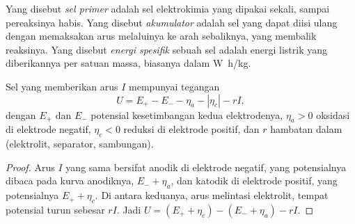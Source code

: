 \begin{definition}[Baterai]\label{def:b2:batteries-electrolysis:battery}
Yang disebut \emph{sel primer} adalah sel elektrokimia
yang dipakai sekali, sampai pereaksinya habis. Yang disebut
\emph{akumulator} adalah sel yang dapat diisi ulang
dengan memaksakan arus melaluinya ke arah sebaliknya, yang membalik
reaksinya. Yang disebut \emph{energi spesifik}
sebuah sel adalah energi listrik yang diberikannya per satuan massa,
biasanya dalam \unit{W.h/kg}.
\end{definition}

\begin{proposition}\label{prop:b2:batteries-electrolysis:delivering}
Sel yang memberikan arus $I$ mempunyai tegangan
\[
  U = E_+ - E_- - \eta_a - |\eta_c| - rI ,
\]
dengan $E_+$ dan $E_-$ potensial kesetimbangan kedua elektrodenya,
$\eta_a > 0$  oksidasi di elektrode negatif, $\eta_c < 0$
 reduksi di elektrode positif, dan $r$ hambatan dalam
(elektrolit, separator, sambungan).
\end{proposition}

\begin{proof}
Arus $I$ yang sama bersifat anodik di elektrode negatif, yang potensialnya
dibaca pada kurva anodiknya, $E_- + \eta_a$, dan katodik di elektrode
positif, yang potensialnya $E_+ + \eta_c$. Di antara keduanya, arus
melintasi elektrolit, tempat potensial turun sebesar $rI$. Jadi
$U = (E_+ + \eta_c) - (E_- +
\eta_a) - rI$.
\end{proof}

